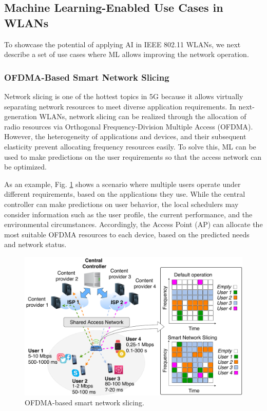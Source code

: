 \documentclass{article}
\begin{document}
\subsection{Machine Learning-Enabled Use Cases in WLANs}
To showcase the potential of applying AI in IEEE 802.11 WLANs, we next describe a set of use cases where ML allows improving the network operation.

\subsubsection{OFDMA-Based Smart Network Slicing} 
Network slicing is one of the hottest topics in 5G because it allows virtually separating network resources to meet diverse application requirements. In next-generation WLANs, network slicing can be realized through the allocation of radio resources via Orthogonal Frequency-Division Multiple Access (OFDMA). However, the heterogeneity of applications and devices, and their subsequent elasticity prevent allocating frequency resources easily. To solve this, ML can be used to make predictions on the user requirements so that the access network can be optimized.

As an example, Fig. \ref{fig:use_cases} shows a scenario where multiple users operate under different requirements, based on the applications they use. While the central controller can make predictions on user behavior, the local schedulers may consider information such as the user profile, the current performance, and the environmental circumstances. Accordingly, the Access Point (AP) can allocate the most suitable OFDMA resources to each device, based on the predicted needs and network status.

\begin{figure}[ht!]
	\centering
	\includegraphics[width=1\columnwidth]{network_slicing_ofdma}
	\caption{OFDMA-based smart network slicing.}
	\label{fig:use_cases}
\end{figure}
\end{document}
